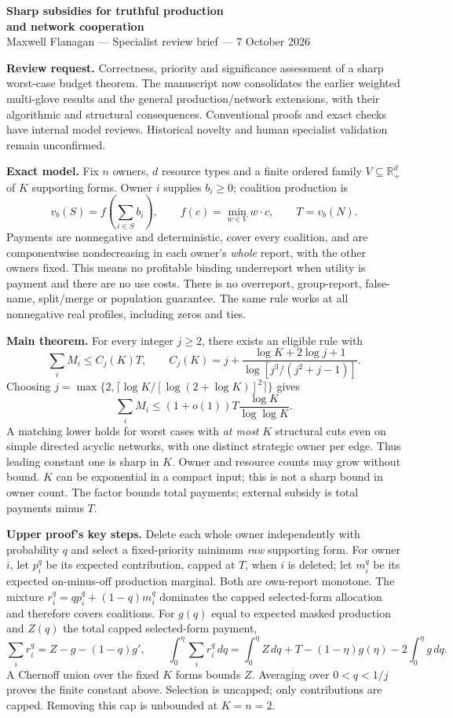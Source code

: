 \documentclass[11pt]{article}
\begin{document}
\begin{center}
{\Large\bfseries Sharp subsidies for truthful production\\and network cooperation}\\[6pt]
Maxwell Flanagan --- Specialist review brief --- 7 October 2026
\end{center}

\textbf{Review request.} Correctness, priority and significance assessment of a
sharp worst-case budget theorem. The manuscript now consolidates the earlier
weighted multi-glove results and the general production/network extensions,
with their algorithmic and structural consequences. Conventional proofs and
exact checks have internal model reviews. Historical novelty and human
specialist validation remain unconfirmed.

\textbf{Exact model.} Fix $n$ owners, $d$ resource types and a finite ordered
family $V\subseteq\mathbb R_+^d$ of $K$ supporting forms. Owner $i$ supplies
$b_i\ge0$; coalition production is
\[
 v_b(S)=f\left(\sum_{i\in S}b_i\right),\qquad
 f(c)=\min_{w\in V}w\cdot c,\qquad T=v_b(N).
\]
Payments are nonnegative and deterministic, cover every coalition, and are
componentwise nondecreasing in each owner's \emph{whole} report, with the
other owners fixed. This means no profitable binding underreport when utility
is payment and there are no use costs. There is no overreport, group-report,
false-name, split/merge or population guarantee. The same rule works at all
nonnegative real profiles, including zeros and ties.

\textbf{Main theorem.} For every integer $j\ge2$, there exists an eligible rule with
\[
 \sum_i M_i\le C_j(K)T,\qquad
 C_j(K)=j+\frac{\log K+2\log j+1}{\log[j^3/(j^2+j-1)]}.
\]
Choosing $j=\max\{2,\lceil\log K/[\log(2+\log K)]^2\rceil\}$ gives
\[
 \boxed{\quad\sum_i M_i\le(1+o(1))T\frac{\log K}{\log\log K}.\quad}
\]
A matching lower holds for worst cases with \emph{at most} $K$ structural
cuts even on simple directed acyclic networks, with one distinct strategic
owner per edge. Thus leading constant one is sharp in $K$. Owner and resource
counts may grow without bound. $K$ can be exponential in a compact input;
this is not a sharp bound in owner count. The factor bounds total payments;
external subsidy is total payments minus $T$.

\textbf{Upper proof's key steps.} Delete each whole owner independently with
probability $q$ and select a fixed-priority minimum \emph{raw} supporting form.
For owner $i$, let $p_i^q$ be its expected contribution, capped at $T$, when
$i$ is deleted; let $m_i^q$ be its expected on-minus-off production marginal.
Both are own-report monotone. The mixture
$r_i^q=qp_i^q+(1-q)m_i^q$ dominates the capped selected-form allocation and
therefore covers coalitions. For $g(q)$ equal to expected masked production
and $Z(q)$ the total capped selected-form payment,
\[
 \sum_i r_i^q=Z-g-(1-q)g',\qquad
 \int_0^\eta\sum_i r_i^q\,dq
 =\int_0^\eta Z\,dq+T-(1-\eta)g(\eta)-2\int_0^\eta g\,dq.
\]
A Chernoff union over the fixed $K$ forms bounds $Z$. Averaging over
$0<q<1/j$ proves the finite constant above. Selection is uncapped;
only contributions are capped. Removing this cap is unbounded at $K=n=2$.
\end{document}
